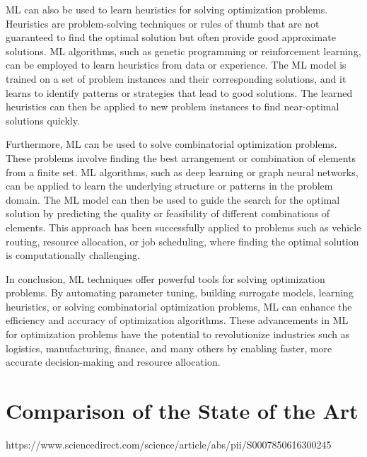 ML can also be used to learn heuristics for solving optimization problems. Heuristics are problem-solving techniques or rules of thumb that are not guaranteed to find the optimal solution but often provide good approximate solutions. ML algorithms, such as genetic programming or reinforcement learning, can be employed to learn heuristics from data or experience. The ML model is trained on a set of problem instances and their corresponding solutions, and it learns to identify patterns or strategies that lead to good solutions. The learned heuristics can then be applied to new problem instances to find near-optimal solutions quickly.

Furthermore, ML can be used to solve combinatorial optimization problems. These problems involve finding the best arrangement or combination of elements from a finite set. ML algorithms, such as deep learning or graph neural networks, can be applied to learn the underlying structure or patterns in the problem domain. The ML model can then be used to guide the search for the optimal solution by predicting the quality or feasibility of different combinations of elements. This approach has been successfully applied to problems such as vehicle routing, resource allocation, or job scheduling, where finding the optimal solution is computationally challenging.

In conclusion, ML techniques offer powerful tools for solving optimization problems. By automating parameter tuning, building surrogate models, learning heuristics, or solving combinatorial optimization problems, ML can enhance the efficiency and accuracy of optimization algorithms. These advancements in ML for optimization problems have the potential to revolutionize industries such as logistics, manufacturing, finance, and many others by enabling faster, more accurate decision-making and resource allocation.
\section{Comparison of the State of the Art}%
https://www.sciencedirect.com/science/article/abs/pii/S0007850616300245
